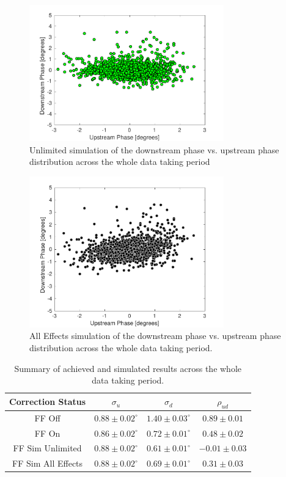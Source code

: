 \begin{figure}
  \centering
  \includegraphics[width=0.75\textwidth]{Figures/feedforward/longFF_scatterFFSimOpt}
  \caption{Unlimited simulation of the downstream phase vs. upstream phase distribution across the whole data taking period}
  \label{f:longFF_scatterFFSimOpt}
\end{figure}

\begin{figure}
  \centering
  \includegraphics[width=0.75\textwidth]{Figures/feedforward/longFF_scatterFFSimReal}
  \caption{All Effects simulation of the downstream phase vs. upstream phase distribution across the whole data taking period.}
  \label{f:longFF_scatterFFSimReal}
\end{figure}

\begin{table}
  \begin{center}
    \begin{tabular}{| c c c c |}
	   \hline
       Correction Status & \(\sigma_u\) & \(\sigma_d\) & \(\rho_{ud}\) \\ \hline
       FF Off & \(0.88\pm0.02^\circ\) & \(1.40\pm0.03^\circ\) & \(0.89\pm0.01\) \\
	   FF On & \(0.86\pm0.02^\circ\) & \(0.72\pm0.01^\circ\) & \(0.48\pm0.02\) \\
	   FF Sim Unlimited & \(0.88\pm0.02^\circ\) & \(0.61\pm0.01^\circ\) & \(-0.01\pm0.03\) \\
	   FF Sim All Effects & \(0.88\pm0.02^\circ\) & \(0.69\pm0.01^\circ\) & \(0.31\pm0.03\) \\
    \hline
    \end{tabular}
    \caption{Summary of achieved and simulated results across the whole data taking period.}
  	\label{t:LongFF}
  \end{center}
\end{table}


